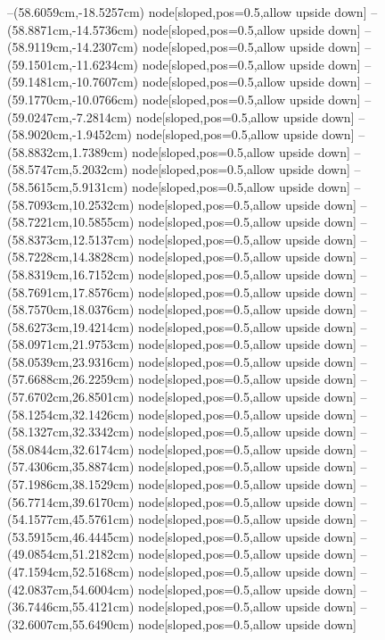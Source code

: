 --(58.6059cm,-18.5257cm) node[sloped,pos=0.5,allow upside down]{\arrowIn}
--(58.8871cm,-14.5736cm) node[sloped,pos=0.5,allow upside down]{\ArrowIn}
--(58.9119cm,-14.2307cm) node[sloped,pos=0.5,allow upside down]{\arrowIn}
--(59.1501cm,-11.6234cm) node[sloped,pos=0.5,allow upside down]{\ArrowIn}
--(59.1481cm,-10.7607cm) node[sloped,pos=0.5,allow upside down]{\arrowIn}
--(59.1770cm,-10.0766cm) node[sloped,pos=0.5,allow upside down]{\arrowIn}
--(59.0247cm,-7.2814cm) node[sloped,pos=0.5,allow upside down]{\ArrowIn}
--(58.9020cm,-1.9452cm) node[sloped,pos=0.5,allow upside down]{\ArrowIn}
--(58.8832cm,1.7389cm) node[sloped,pos=0.5,allow upside down]{\ArrowIn}
--(58.5747cm,5.2032cm) node[sloped,pos=0.5,allow upside down]{\ArrowIn}
--(58.5615cm,5.9131cm) node[sloped,pos=0.5,allow upside down]{\arrowIn}
--(58.7093cm,10.2532cm) node[sloped,pos=0.5,allow upside down]{\ArrowIn}
--(58.7221cm,10.5855cm) node[sloped,pos=0.5,allow upside down]{\arrowIn}
--(58.8373cm,12.5137cm) node[sloped,pos=0.5,allow upside down]{\ArrowIn}
--(58.7228cm,14.3828cm) node[sloped,pos=0.5,allow upside down]{\ArrowIn}
--(58.8319cm,16.7152cm) node[sloped,pos=0.5,allow upside down]{\ArrowIn}
--(58.7691cm,17.8576cm) node[sloped,pos=0.5,allow upside down]{\ArrowIn}
--(58.7570cm,18.0376cm) node[sloped,pos=0.5,allow upside down]{\arrowIn}
--(58.6273cm,19.4214cm) node[sloped,pos=0.5,allow upside down]{\ArrowIn}
--(58.0971cm,21.9753cm) node[sloped,pos=0.5,allow upside down]{\ArrowIn}
--(58.0539cm,23.9316cm) node[sloped,pos=0.5,allow upside down]{\ArrowIn}
--(57.6688cm,26.2259cm) node[sloped,pos=0.5,allow upside down]{\ArrowIn}
--(57.6702cm,26.8501cm) node[sloped,pos=0.5,allow upside down]{\arrowIn}
--(58.1254cm,32.1426cm) node[sloped,pos=0.5,allow upside down]{\ArrowIn}
--(58.1327cm,32.3342cm) node[sloped,pos=0.5,allow upside down]{\arrowIn}
--(58.0844cm,32.6174cm) node[sloped,pos=0.5,allow upside down]{\arrowIn}
--(57.4306cm,35.8874cm) node[sloped,pos=0.5,allow upside down]{\ArrowIn}
--(57.1986cm,38.1529cm) node[sloped,pos=0.5,allow upside down]{\ArrowIn}
--(56.7714cm,39.6170cm) node[sloped,pos=0.5,allow upside down]{\ArrowIn}
--(54.1577cm,45.5761cm) node[sloped,pos=0.5,allow upside down]{\ArrowIn}
--(53.5915cm,46.4445cm) node[sloped,pos=0.5,allow upside down]{\ArrowIn}
--(49.0854cm,51.2182cm) node[sloped,pos=0.5,allow upside down]{\ArrowIn}
--(47.1594cm,52.5168cm) node[sloped,pos=0.5,allow upside down]{\ArrowIn}
--(42.0837cm,54.6004cm) node[sloped,pos=0.5,allow upside down]{\ArrowIn}
--(36.7446cm,55.4121cm) node[sloped,pos=0.5,allow upside down]{\ArrowIn}
--(32.6007cm,55.6490cm) node[sloped,pos=0.5,allow upside down]{\ArrowIn}
